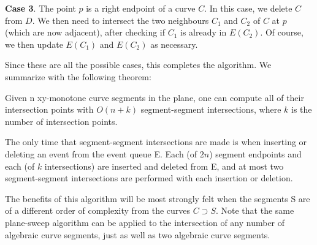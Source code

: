 {\bf Case 3}.  The point $p$ is a right endpoint of a curve $C$.
In this case, we delete $C$ from $D$.
We then need to intersect the two neighbours $C_{1}$ and $C_{2}$ of $C$ at $p$
(which are now adjacent), after checking if $C_{1}$ is already in $E(C_{2})$.
Of course, we then update $E(C_{1})$ and  $E(C_{2})$ as necessary.

Since these are all the possible cases, this completes the algorithm.
We summarize with the following theorem:
\begin{theorem}
Given n xy-monotone curve segments in the plane, one can compute all of their 
intersection points with $O(n+k)$ segment-segment intersections, 
where $k$ is the number of intersection points.
\end{theorem}
The only time that segment-segment intersections are made is when inserting or deleting an
event from the event queue E.
Each (of $2n$) segment endpoints and each (of $k$ intersections) are inserted and deleted from E,
and at most two segment-segment intersections are performed with each insertion or deletion.
\QED

The benefits of this algorithm will be most strongly felt when the segments S are of 
a different order of complexity from the curves $C \supset S$.
Note that the same plane-sweep algorithm can be applied to the intersection of any 
number of algebraic curve segments, just as well as two algebraic curve segments.

%
%
%
%


